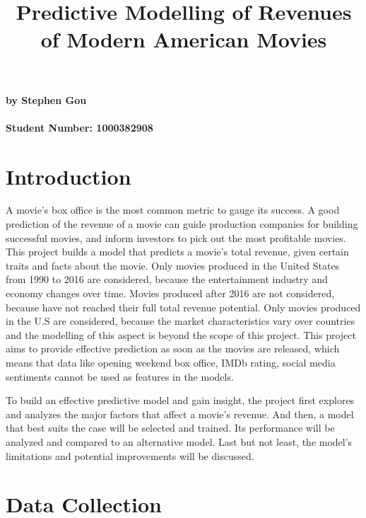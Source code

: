 \documentclass[11pt]{article}
\title{Predictive Modelling of Revenues of Modern American Movies}
\begin{document}
    
    
    \maketitle
    
    

    
    \paragraph{by Stephen Gou}\label{by-stephen-gou}

\paragraph{Student Number: 1000382908}\label{student-number-1000382908}

\section{Introduction}\label{introduction}

A movie's box office is the most common metric to gauge its success. A
good prediction of the revenue of a movie can guide production companies
for building successful movies, and inform investors to pick out the
most profitable movies. This project builds a model that predicts a
movie's total revenue, given certain traits and facts about the movie.
Only movies produced in the United States from 1990 to 2016 are
considered, because the entertainment industry and economy changes over
time. Movies produced after 2016 are not considered, because have not
reached their full total revenue potential. Only movies produced in the
U.S are considered, because the market characteristics vary over
countries and the modelling of this aspect is beyond the scope of this
project. This project aims to provide effective prediction as soon as
the movies are released, which means that data like opening weekend box
office, IMDb rating, social media sentiments cannot be used as features
in the models.

To build an effective predictive model and gain insight, the project
first explores and analyzes the major factors that affect a movie's
revenue. And then, a model that best suits the case will be selected and
trained. Its performance will be analyzed and compared to an alternative
model. Last but not least, the model's limitations and potential
improvements will be discussed.

\section{Data Collection}\label{data-collection}
\end{document}
